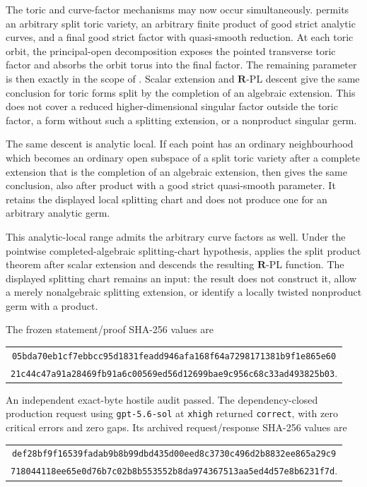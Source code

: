 The toric and curve-factor mechanisms may now occur simultaneously.
 permits an arbitrary
split toric variety, an arbitrary finite product of good strict analytic
curves, and a final good strict factor with quasi-smooth reduction.  At each
toric orbit, the principal-open decomposition exposes the pointed transverse
toric factor and absorbs the orbit torus into the final factor.  The
remaining parameter is then exactly in the scope of
.  Scalar extension and
\(\mathbf R\)-PL descent give the same conclusion for toric forms split by the
completion of an algebraic extension.  This does not cover a reduced
higher-dimensional singular factor outside the toric factor, a form without
such a splitting extension, or a nonproduct singular germ.

The same descent is analytic local.  If each point has an ordinary
neighbourhood which becomes an ordinary open subspace of a split toric
variety after a complete extension that is the completion of an algebraic
extension, then
 gives the same
conclusion, also after product with a good strict quasi-smooth parameter.
It retains the displayed local splitting chart and does not produce one for
an arbitrary analytic germ.

This analytic-local range admits the arbitrary curve factors as well.
Under the pointwise completed-algebraic splitting-chart hypothesis,
 applies the
split product theorem after scalar extension and descends the resulting
\(\mathbf R\)-PL function.  The displayed splitting chart remains an input:
the result does not construct it, allow a merely nonalgebraic splitting
extension, or identify a locally twisted nonproduct germ with a product.

The frozen statement/proof SHA-256 values are
\begin{center}
\small
\begin{tabular}{@{}c@{}}
\nolinkurl{05bda70eb1cf7ebbcc95d1831feadd946afa168f64a7298171381b9f1e865e60}\\
\nolinkurl{21c44c47a91a28469fb91a6c00569ed56d12699bae9c956c68c33ad493825b03}.
\end{tabular}
\end{center}
An independent exact-byte hostile audit passed.  The dependency-closed
production request using \texttt{gpt-5.6-sol} at \texttt{xhigh} returned
\texttt{correct}, with zero critical errors and zero gaps.  Its archived
request/response SHA-256 values are
\begin{center}
\small
\begin{tabular}{@{}c@{}}
\nolinkurl{def28bf9f16539fadab9b8b99dbd435d00eed8c3730c496d2b8832ee865a29c9}\\
\nolinkurl{718044118ee65e0d76b7c02b8b553552b8da974367513aa5ed4d57e8b6231f7d}.
\end{tabular}
\end{center}

